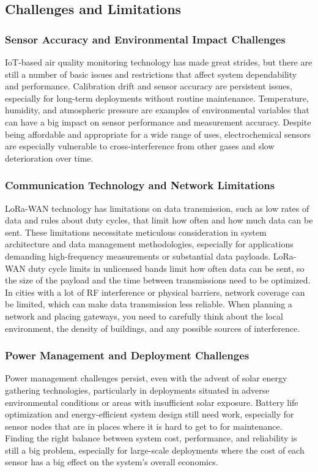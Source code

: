 \documentclass[conference]{IEEEtran}
\begin{document}
\subsection{Challenges and Limitations}
\subsubsection{Sensor Accuracy and Environmental Impact Challenges}
IoT-based air quality monitoring technology has made great strides, but there are still a number of basic issues and restrictions that affect system dependability and performance. Calibration drift and sensor accuracy are persistent issues, especially for long-term deployments without routine maintenance. Temperature, humidity, and atmospheric pressure are examples of environmental variables that can have a big impact on sensor performance and measurement accuracy. Despite being affordable and appropriate for a wide range of uses, electrochemical sensors are especially vulnerable to cross-interference from other gases and slow deterioration over time.

\subsubsection{Communication Technology and Network Limitations}
LoRa-WAN technology has limitations on data transmission, such as low rates of data and rules about duty cycles, that limit how often and how much data can be sent. These limitations necessitate meticulous consideration in system architecture and data management methodologies, especially for applications demanding high-frequency measurements or substantial data payloads. LoRa-WAN duty cycle limits in unlicensed bands limit how often data can be sent, so the size of the payload and the time between transmissions need to be optimized. In cities with a lot of RF interference or physical barriers, network coverage can be limited, which can make data transmission less reliable. When planning a network and placing gateways, you need to carefully think about the local environment, the density of buildings, and any possible sources of interference.

\subsubsection{Power Management and Deployment Challenges}
Power management challenges persist, even with the advent of solar energy gathering technologies, particularly in deployments situated in adverse environmental conditions or areas with insufficient solar exposure. Battery life optimization and energy-efficient system design still need work, especially for sensor nodes that are in places where it is hard to get to for maintenance. Finding the right balance between system cost, performance, and reliability is still a big problem, especially for large-scale deployments where the cost of each sensor has a big effect on the system's overall economics.
\end{document}

